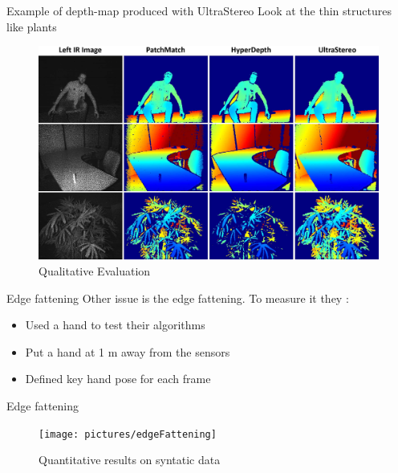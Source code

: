 \begin{frame}{Example of depth-map produced with UltraStereo}
Look at the thin structures like plants
\begin{figure}
\includegraphics[scale=0.08]{pictures/fig5}
\caption{Qualitative Evaluation}
\end{figure}
\end{frame}

\begin{frame}{Edge fattening}
Other issue is the edge fattening. To measure it they :
\begin{itemize}
\item Used a hand to test their algorithms
\item Put a hand at 1 m away from the sensors
\item Defined key hand pose for each frame
\end{itemize}
\end{frame}

\begin{frame}{Edge fattening}
\begin{figure}
\texttt{[image: pictures/edgeFattening]}
\caption{Quantitative results on syntatic data}
\end{figure}
\end{frame}

